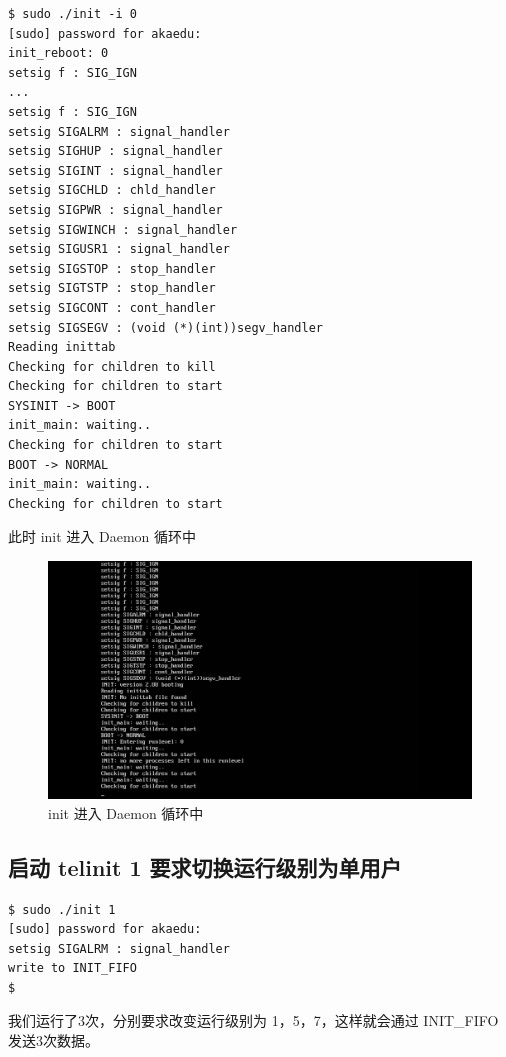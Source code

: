 {\begin{shaded}\begin{verbatim}
$ sudo ./init -i 0
[sudo] password for akaedu: 
init_reboot: 0
setsig f : SIG_IGN  
...
setsig f : SIG_IGN  
setsig SIGALRM : signal_handler 
setsig SIGHUP : signal_handler  
setsig SIGINT : signal_handler  
setsig SIGCHLD : chld_handler   
setsig SIGPWR : signal_handler  
setsig SIGWINCH : signal_handler    
setsig SIGUSR1 : signal_handler 
setsig SIGSTOP : stop_handler   
setsig SIGTSTP : stop_handler   
setsig SIGCONT : cont_handler   
setsig SIGSEGV : (void (*)(int))segv_handler    
Reading inittab
Checking for children to kill
Checking for children to start
SYSINIT -> BOOT
init_main: waiting..
Checking for children to start
BOOT -> NORMAL
init_main: waiting..
Checking for children to start
\end{verbatim}\end{shaded}}
此时 init 进入 Daemon 循环中

\begin{figure}[htbp]
\centering
\includegraphics{./pictures/init-daemon-begin.png}
\caption{init 进入 Daemon 循环中}
\end{figure}

\subsection{启动 telinit 1 要求切换运行级别为单用户}

{\begin{shaded}\begin{verbatim}
$ sudo ./init 1
[sudo] password for akaedu: 
setsig SIGALRM : signal_handler 
write to INIT_FIFO
$ 
\end{verbatim}\end{shaded}}
我们运行了3次，分别要求改变运行级别为 1，5，7，这样就会通过 INIT\_FIFO
发送3次数据。

